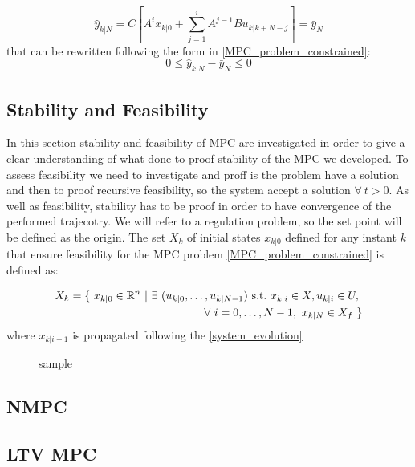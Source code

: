 \begin{equation}
\hat{y}_{k|N}=C\left[A^i x_{k|0} + \sum_{j=1}^{i} A^{j-1}Bu_{k|k+N-j}\right]=\bar{y}_N
\end{equation}
that can be rewritten following the form in \ref{MPC_problem_constrained}: 
\begin{equation}
0 \leq \hat{y}_{k|N}-\bar{y}_N \leq 0
\end{equation} 

\subsection{Stability and Feasibility}

In this section stability and feasibility of MPC are investigated in order to give a clear understanding of what done to proof stability of the MPC we developed. To assess feasibility we need to investigate and proff is the problem have a solution and then to proof recursive feasibility, so the system accept a solution $\forall\  t>0$. As well as feasibility, stability has to be proof in order to have convergence of the performed trajecotry. We will refer to a regulation problem, so the set point will be defined as the origin.
The set $X_{k}$ of initial states $x_{k|0}$ defined for any instant $k$ that ensure feasibility for the MPC problem \ref{MPC_problem_constrained} is defined as:

\begin{equation}
	\begin{split}
		X_{k}=\lbrace\ x_{k|0}\in\mathbb{R}^n\ |\ \exists\  (u_{k|0}, \dots , u_{k|N-1})\ \textnormal{s.t.}\ x_{k|i} \in X, u_{k|i} \in U,\ &  \\ 
		\forall\  i=0,\dots,N-1,\ x_{k|N} \in X_f\ \rbrace& \\ 
	\end{split}
\end{equation}
where $x_{k|i+1}$ is propagated following the \ref{system_evolution}


\begin{figure}%
\centering
{}%
\qquad
{}%
\caption{sample}
\end{figure}


\subsection{NMPC}
\subsection{LTV MPC} %
